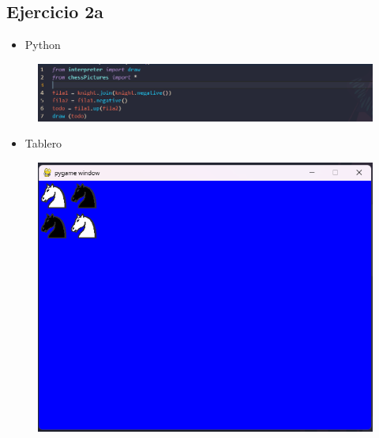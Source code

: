 \documentclass{article}
\begin{document}
	\subsection{Ejercicio 2a}
	\begin{itemize}
		\item Python
	\end{itemize}
	\begin{figure}[H]
		\centering
		\includegraphics[width=1.0\textwidth, keepaspectratio]{img/ejercicio2a}
	\end{figure}
	\begin{itemize}
		\item Tablero
	\end{itemize}
	\begin{figure}[H]
		\centering
		\includegraphics[width=1.0\textwidth, keepaspectratio]{img/ejercicio2aa}
	\end{figure}
	
\end{document}
